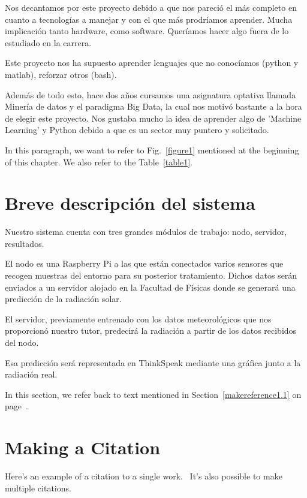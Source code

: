 Nos decantamos por este proyecto debido a que nos pareció el más completo en cuanto a tecnologías a manejar y con el que más prodríamos aprender. Mucha implicación tanto hardware, como software. Queríamos hacer algo fuera de lo estudiado en la carrera.

Este proyecto nos ha supuesto aprender lenguajes que no conocíamos (python y matlab), reforzar otros (bash).

Además de todo esto, hace dos años cursamos una asignatura optativa llamada Minería de datos y el paradigma Big Data, la cual nos motivó bastante a la hora de elegir este proyecto. Nos gustaba mucho la idea de aprender algo de 'Machine Learning' y Python debido a que es un sector muy puntero y solicitado.

In this paragraph, we want to refer to Fig.~\ref{figure1}
mentioned at the beginning of this chapter.  We also refer to the
Table~\ref{table1}.

\section{Breve descripción del sistema}
\label{makereference1.2}

Nuestro sistema cuenta con tres grandes módulos de trabajo: nodo, servidor, resultados.

El nodo es una Raspberry Pi a las que están conectados varios sensores que recogen muestras del entorno para su posterior tratamiento. Dichos datos serán enviados a un servidor alojado en la Facultad de Físicas donde se generará una predicción de la radiación solar.

El servidor, previamente entrenado con los datos meteorológicos que nos proporcionó nuestro tutor, predecirá la radiación a partir de los datos recibidos del nodo. 

Esa predicción será representada en ThinkSpeak mediante una gráfica junto a la radiación real.

In this section, we refer back to text mentioned in
Section~\ref{makereference1.1} on page~\pageref{makereference1.1}.

\section{Making a Citation}
\label{makereference1.3}

Here's an example of a citation to a single
work.~\cite{CT:Weiner:1999} It's also possible to make multiple
citations.~\cite{CT:Phillips:1985, ARP:Loy:1974}
